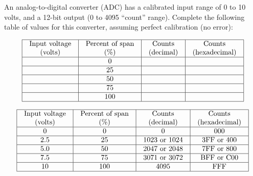 

An analog-to-digital converter (ADC) has a calibrated input range of 0 to 10 volts, and a 12-bit output (0 to 4095 ``count'' range).  Complete the following table of values for this converter, assuming perfect calibration (no error):


$$\vbox{\offinterlineskip
\halign{\strut
\vrule \quad\hfil # \ \hfil & 
\vrule \quad\hfil # \ \hfil & 
\vrule \quad\hfil # \ \hfil & 
\vrule \quad\hfil # \ \hfil \vrule \cr
\noalign{\hrule}
%
Input voltage & Percent of span & Counts & Counts \cr
%
(volts) & (\%) & (decimal) & (hexadecimal) \cr
%
\noalign{\hrule}
%
 & 0 &  & \cr
%
\noalign{\hrule}
%
 & 25 &  & \cr
%
\noalign{\hrule}
%
 & 50 &  & \cr
%
\noalign{\hrule}
%
 & 75 &  &  \cr
%
\noalign{\hrule}
%
 & 100 &  &  \cr
%
\noalign{\hrule}
} %
}$$ %








$$\vbox{\offinterlineskip
\halign{\strut
\vrule \quad\hfil # \ \hfil & 
\vrule \quad\hfil # \ \hfil & 
\vrule \quad\hfil # \ \hfil & 
\vrule \quad\hfil # \ \hfil \vrule \cr
\noalign{\hrule}
%
Input voltage & Percent of span & Counts & Counts \cr
%
(volts) & (\%) & (decimal) & (hexadecimal) \cr
%
\noalign{\hrule}
%
0 & 0 & 0 & 000 \cr
%
\noalign{\hrule}
%
2.5 & 25 & 1023 or 1024 & 3FF or 400 \cr
%
\noalign{\hrule}
%
5.0 & 50 & 2047 or 2048 & 7FF or 800 \cr
%
\noalign{\hrule}
%
7.5 & 75 & 3071 or 3072 & BFF or C00 \cr
%
\noalign{\hrule}
%
10 & 100 & 4095 & FFF \cr
%
\noalign{\hrule}
} %
}$$ %











